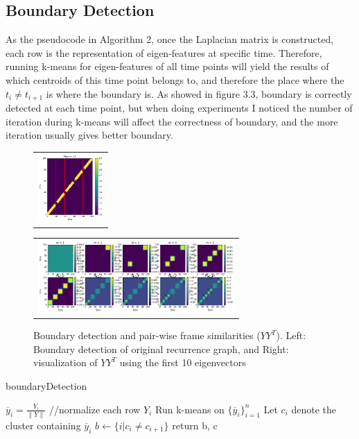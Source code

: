 \documentclass[final]{siamltexmm}
\begin{document}
\subsection{Boundary Detection}
As the pseudocode in Algorithm 2, once the Laplacian matrix is constructed, each row is the representation of eigen-features at specific time. Therefore, running k-means for eigen-features of all time points will yield the results of which centroids of this time point belongs to, and therefore the place where the $t_{i} \neq t_{i+1}$ is where the boundary is. As showed in figure 3.3, boundary is correctly detected at each time point, but when doing experiments I noticed the number of iteration during k-means will affect the correctness of boundary, and the more iteration usually gives better boundary.
\begin{figure}[H]
\centering
\begin{subfigure}
  \begin{tabular}{c}
  \includegraphics[width=25mm]{./figure/o3_boundary.png}
  \end{tabular}{}
\end{subfigure}
  \begin{tabular}{c}
  \includegraphics[width=75mm]{./figure/o3_eachM.png}
  \end{tabular}{}
\begin{subfigure}
\end{subfigure}
\caption{Boundary detection and pair-wise frame similarities ($YY^T$). Left: Boundary detection of original recurrence graph, and Right: visualization of $YY^T$ using the first 10 eigenvectors}
\end{figure}

\begin{algorithm}[htb]
  \caption{boundaryDetection}

  \label{algo:SC}
\begin{algorithmic}[1]
  \STATE $ \overline y_i = \frac{Y_i}{\parallel Y \parallel}$ //normalize each row $Y_i$
  \STATE Run k-means on $\{ \overline y_i \}_{i=1}^{n}$
  \STATE Let $c_i$ denote the cluster containing $ \overline y_i$
  \STATE $b \leftarrow \{ i|c_i \neq c_{i+1}\}$
  \STATE return b, c
\end{algorithmic}
\end{algorithm}
\end{document}
